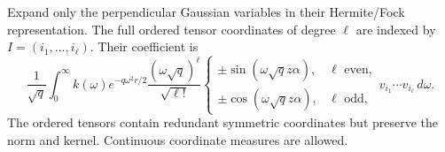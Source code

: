 \documentclass[11pt]{article}
\begin{document}
Expand only the perpendicular Gaussian variables in their Hermite/Fock representation. The full ordered tensor coordinates of degree $\ell$ are indexed by $I=(i_1,\ldots,i_\ell)$. Their coefficient is
\begin{equation}
 \frac1{\sqrt q}\int_0^\infty k(\omega)e^{-q\omega^2r/2}
 \frac{(\omega\sqrt q)^\ell}{\sqrt{\ell!}}
 \begin{cases}\pm\sin(\omega\sqrt qz\alpha),&\ell\text{ even},\\
 \pm\cos(\omega\sqrt qz\alpha),&\ell\text{ odd},\end{cases}
 v_{i_1}\cdots v_{i_\ell}\,d\omega.
 \label{eq:fock}
\end{equation}
The ordered tensors contain redundant symmetric coordinates but preserve the norm and kernel. Continuous coordinate measures are allowed.
\end{document}
